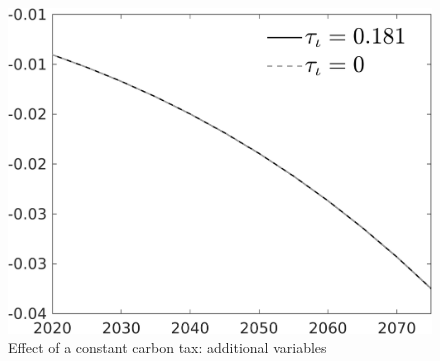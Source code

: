 %
%

\begin{figure}[h!!]
	\centering
	\caption{Effect of a constant carbon tax: additional variables }\label{fig:Leveltauf_nsk0_xgr0_add}	
\begin{minipage}[]{0.32\textwidth}
	\includegraphics[width=1\textwidth]{../../codding_model/own_basedOnFried/optimalPol_010922_revision/figures/all_13Sept22/PerdifNoTauf_regime0_CompTaul_snS_spillover0_nsk0_xgr0_knspil0_sep0_LFlimit0_emsbase0_countec0_GovRev0_etaa0.79_lgd1.png}
\end{minipage}
\begin{minipage}[]{0.32\textwidth}

\end{minipage}
\end{figure}

